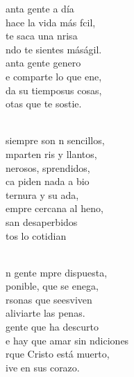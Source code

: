 \begin{cancion}%
	anta gente a día\\
	hace la vida más fcil,\\
	te saca una nrisa\\
	ndo te sientes máságil.\\
	anta gente genero\\
	e comparte lo que ene,\\
	 da su tiemposus cosas,\\
	otas que te sostie.\\\jump\\
	\begin{chorus}%
	siempre son n sencillos,\\
	mparten ris y llantos,\\
	nerosos, sprendidos,\\
	ca piden nada a bio\\
	 ternura y su ada,\\
	empre cercana al heno,\\
	san desaperbidos\\
	tos lo cotidian\\
	\end{chorus}%
	\jump\\
	n gente mpre dispuesta,\\
	ponible, que se enega,\\
	rsonas que seesviven\\
	 aliviarte las penas.\\
	 gente que ha descurto\\
	e hay que amar sin ndiciones\\
	rque Cristo  está muerto,\\
	ive en sus corazo.\\\jump\\

\end{cancion}
